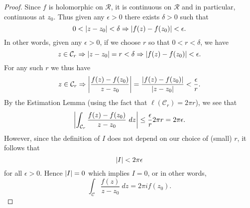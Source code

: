 \begin{proof}
Since $f$ is holomorphic on $\mathcal{R}$, it is continuous on $\mathcal{R}$ and in particular, continuous at $z_0$.  Thus given any $\epsilon>0$ there exists $\delta>0$ such that
\[
0 < \left| z-z_0 \right| < \delta \Rightarrow \left|  f(z)-f(z_0)  \right| < \epsilon.
\]
In other words, given any $\epsilon >0$, if we choose $r$ so that $0<r < \delta$, we have
\[
z \in \mathcal{C}_r \Rightarrow \left| z-z_0 \right| = r < \delta \Rightarrow \left| f(z)-f(z_0) \right| < \epsilon.
\]
For any such $r$ we thus have
\[
z \in \mathcal{C}_r \Rightarrow \left| \frac{f(z)-f(z_0)}{z-z_0} \right| = \frac{\left| f(z)-f(z_0) \right|}{\left| z-z_0 \right|} < \frac{\epsilon}{r}.
\]
By the Estimation Lemma (using the fact that $\ell ( \mathcal{C}_r ) = 2 \pi r$), we see that
\[
\left| \int_{\mathcal{C}_r} \frac{f(z)-f(z_0)}{z-z_0}\ dz \right| \leq \frac{\epsilon}{r} 2 \pi r = 2\pi \epsilon.
\]
However, since the definition of $I$ does not depend on our choice of (small) $r$, it follows that
\[
\left| I \right| < 2 \pi \epsilon
\]
for all $\epsilon>0$.  Hence $\left| I \right|=0$ which implies $I=0$, or in other words,
\[
\int_{\mathcal{C}} \frac{f(z)}{z-z_0}\ dz = 2 \pi i f(z_0).
\]


\end{proof}

